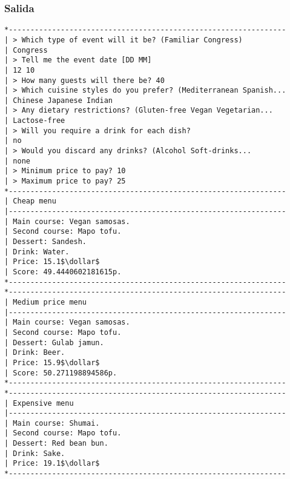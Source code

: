 \documentclass{article}
\newcommand{\dollar}{\mbox{\textdollar}}
\begin{document}
\subsubsection{Salida}
\begin{lstlisting}
*----------------------------------------------------------------
| > Which type of event will it be? (Familiar Congress)
| Congress
| > Tell me the event date [DD MM]
| 12 10
| > How many guests will there be? 40
| > Which cuisine styles do you prefer? (Mediterranean Spanish...
| Chinese Japanese Indian
| > Any dietary restrictions? (Gluten-free Vegan Vegetarian...
| Lactose-free
| > Will you require a drink for each dish?
| no
| > Would you discard any drinks? (Alcohol Soft-drinks...
| none
| > Minimum price to pay? 10
| > Maximum price to pay? 25
*----------------------------------------------------------------
| Cheap menu
|----------------------------------------------------------------
| Main course: Vegan samosas.
| Second course: Mapo tofu.
| Dessert: Sandesh.
| Drink: Water.
| Price: 15.1$\dollar$
| Score: 49.4440602181615p.
*----------------------------------------------------------------
*----------------------------------------------------------------
| Medium price menu
|----------------------------------------------------------------
| Main course: Vegan samosas.
| Second course: Mapo tofu.
| Dessert: Gulab jamun.
| Drink: Beer.
| Price: 15.9$\dollar$
| Score: 50.271198894586p.
*----------------------------------------------------------------
*----------------------------------------------------------------
| Expensive menu
|----------------------------------------------------------------
| Main course: Shumai.
| Second course: Mapo tofu.
| Dessert: Red bean bun.
| Drink: Sake.
| Price: 19.1$\dollar$
*----------------------------------------------------------------
\end{lstlisting}
\end{document}
